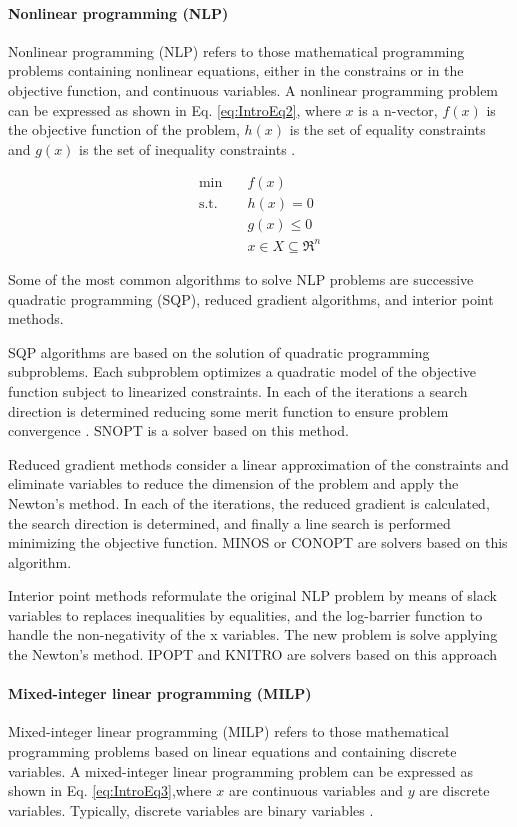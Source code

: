 \begin{refsection}[referencesCh1]
\paragraph{Nonlinear programming (NLP)}
Nonlinear programming (NLP) refers to those mathematical programming problems containing nonlinear equations, either in the constrains or in the objective function, and continuous variables. A nonlinear programming problem can be expressed as shown in Eq.  \ref{eq:IntroEq2}, where $x$ is a n-vector, $f(x)$ is the objective function of the problem, $h(x)$ is the set of equality constraints and $g(x)$ is the set of inequality constraints \citep{floudas1995nonlinear}.

\begin{align}
\label{eq:IntroEq2}
\min \quad & f(x) \nonumber\\
\textrm{s.t.} \quad & h(x)=0\\
& g(x) \leq 0 \nonumber\\
&x \in X  \subseteq \Re^{n} \nonumber
\end{align}

Some of the most common algorithms to solve NLP problems are successive quadratic programming (SQP), reduced gradient algorithms, and interior point methods. 

SQP algorithms are based on the solution of quadratic programming subproblems. Each subproblem optimizes a quadratic model of the objective function subject to linearized constraints. In each of the iterations a search direction is determined reducing some merit function to ensure problem convergence \citep{gill2005snopt}. SNOPT is a solver based on this method.

Reduced gradient methods consider a linear approximation of the constraints and eliminate variables to reduce the dimension of the problem and apply the Newton’s method. In each of the iterations, the reduced gradient is calculated, the search direction is determined, and finally
a line search is performed minimizing the objective function. MINOS or CONOPT are solvers based on this algorithm.

Interior point methods reformulate the original NLP problem by means of slack variables to replaces inequalities by equalities, and the log-barrier function to handle the non-negativity of the x variables. The new problem is solve applying the Newton's method. IPOPT and KNITRO are solvers based on this approach

\paragraph{Mixed-integer linear programming (MILP)}
Mixed-integer linear programming (MILP) refers to those mathematical programming problems based on linear equations and containing discrete variables. A mixed-integer linear programming problem can be expressed as shown in Eq. \ref{eq:IntroEq3},where $x$ are continuous variables and $y$ are discrete variables. Typically, discrete variables are binary variables \citep{grossmann2021advanced}.


\end{refsection}
